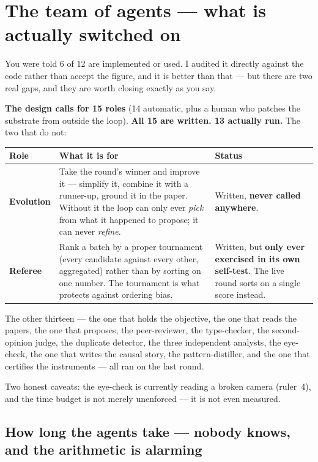 \documentclass[11pt,a4paper]{article}
\begin{document}
\section{The team of agents --- what is actually switched on}\label{sec:agents}

You were told 6 of 12 are implemented or used. I audited it directly against the code rather than
accept the figure, and it is better than that --- but there are two real gaps, and they are worth
closing exactly as you say.

\textbf{The design calls for 15 roles} (14 automatic, plus a human who patches the substrate from
outside the loop). \textbf{All 15 are written. 13 actually run.} The two that do not:

\begin{center}\small
\begin{tabular}{@{}l p{6.2cm} p{6.4cm}@{}}
\toprule
\textbf{Role} & \textbf{What it is for} & \textbf{Status}\\
\midrule
\textbf{Evolution}
& Take the round's winner and improve it --- simplify it, combine it with a runner-up, ground it
in the paper. Without it the loop can only ever \emph{pick} from what it happened to propose; it
can never \emph{refine}.
& Written, \textcolor{bad}{\textbf{never called anywhere}}.\\
\textbf{Referee}
& Rank a batch by a proper tournament (every candidate against every other, aggregated) rather
than by sorting on one number. The tournament is what protects against ordering bias.
& Written, but \textcolor{bad}{\textbf{only ever exercised in its own self-test}}. The live round
sorts on a single score instead.\\
\bottomrule
\end{tabular}
\end{center}

The other thirteen --- the one that holds the objective, the one that reads the papers, the one
that proposes, the peer-reviewer, the type-checker, the second-opinion judge, the duplicate
detector, the three independent analysts, the eye-check, the one that writes the causal story, the
pattern-distiller, and the one that certifies the instruments --- all ran on the last round.

Two honest caveats: the eye-check is currently reading a broken camera (ruler~4), and the time
budget is not merely unenforced --- it is not even measured.

\subsection{How long the agents take --- nobody knows, and the arithmetic is alarming}
\end{document}
